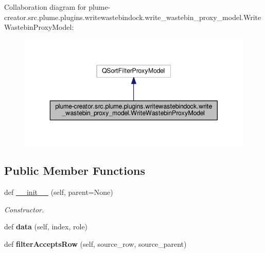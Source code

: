 Collaboration diagram for plume-\/creator.src.\+plume.\+plugins.\+writewastebindock.\+write\+\_\+wastebin\+\_\+proxy\+\_\+model.\+Write\+Wastebin\+Proxy\+Model\+:\nopagebreak
\begin{figure}[H]
\begin{center}
\leavevmode
\includegraphics[width=343pt]{classplume-creator_1_1src_1_1plume_1_1plugins_1_1writewastebindock_1_1write__wastebin__proxy__mo480749914daeebe4c664d237e1110217}
\end{center}
\end{figure}
\subsection*{Public Member Functions}
\begin{DoxyCompactItemize}
\item 
def \hyperlink{classplume-creator_1_1src_1_1plume_1_1plugins_1_1writewastebindock_1_1write__wastebin__proxy__moe56e22e3e5d294c2c5a878e7ed44fa84_a754efc571fa9d02e21f25e2465ea2450}{\+\_\+\+\_\+init\+\_\+\+\_\+} (self, parent=None)\hypertarget{classplume-creator_1_1src_1_1plume_1_1plugins_1_1writewastebindock_1_1write__wastebin__proxy__moe56e22e3e5d294c2c5a878e7ed44fa84_a754efc571fa9d02e21f25e2465ea2450}{}\label{classplume-creator_1_1src_1_1plume_1_1plugins_1_1writewastebindock_1_1write__wastebin__proxy__moe56e22e3e5d294c2c5a878e7ed44fa84_a754efc571fa9d02e21f25e2465ea2450}

\begin{DoxyCompactList}\small\item\em Constructor. \end{DoxyCompactList}\item 
def {\bfseries data} (self, index, role)\hypertarget{classplume-creator_1_1src_1_1plume_1_1plugins_1_1writewastebindock_1_1write__wastebin__proxy__moe56e22e3e5d294c2c5a878e7ed44fa84_aceab086b51e0322e329e7916410c5016}{}\label{classplume-creator_1_1src_1_1plume_1_1plugins_1_1writewastebindock_1_1write__wastebin__proxy__moe56e22e3e5d294c2c5a878e7ed44fa84_aceab086b51e0322e329e7916410c5016}

\item 
def {\bfseries filter\+Accepts\+Row} (self, source\+\_\+row, source\+\_\+parent)\hypertarget{classplume-creator_1_1src_1_1plume_1_1plugins_1_1writewastebindock_1_1write__wastebin__proxy__moe56e22e3e5d294c2c5a878e7ed44fa84_a9f6a348072238bf9dead07cd1ea8f0a7}{}\label{classplume-creator_1_1src_1_1plume_1_1plugins_1_1writewastebindock_1_1write__wastebin__proxy__moe56e22e3e5d294c2c5a878e7ed44fa84_a9f6a348072238bf9dead07cd1ea8f0a7}

\end{DoxyCompactItemize}


